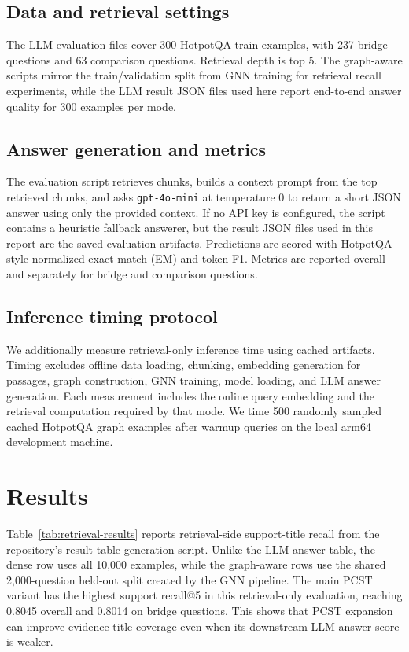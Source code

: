 \documentclass{article}
\begin{document}
\subsection{Data and retrieval settings}

The LLM evaluation files cover 300 HotpotQA train examples, with 237 bridge questions and 63 comparison questions. Retrieval depth is top 5. The graph-aware scripts mirror the train/validation split from GNN training for retrieval recall experiments, while the LLM result JSON files used here report end-to-end answer quality for 300 examples per mode.

\subsection{Answer generation and metrics}

The evaluation script retrieves chunks, builds a context prompt from the top retrieved chunks, and asks \texttt{gpt-4o-mini} at temperature 0 to return a short JSON answer using only the provided context. If no API key is configured, the script contains a heuristic fallback answerer, but the result JSON files used in this report are the saved evaluation artifacts. Predictions are scored with HotpotQA-style normalized exact match (EM) and token F1. Metrics are reported overall and separately for bridge and comparison questions.

\subsection{Inference timing protocol}

We additionally measure retrieval-only inference time using cached artifacts. Timing excludes offline data loading, chunking, embedding generation for passages, graph construction, GNN training, model loading, and LLM answer generation. Each measurement includes the online query embedding and the retrieval computation required by that mode. We time 500 randomly sampled cached HotpotQA graph examples after warmup queries on the local arm64 development machine.

\section{Results}

Table~\ref{tab:retrieval-results} reports retrieval-side support-title recall from the repository's result-table generation script. Unlike the LLM answer table, the dense row uses all 10,000 examples, while the graph-aware rows use the shared 2,000-question held-out split created by the GNN pipeline. The main PCST variant has the highest support recall@5 in this retrieval-only evaluation, reaching 0.8045 overall and 0.8014 on bridge questions. This shows that PCST expansion can improve evidence-title coverage even when its downstream LLM answer score is weaker.
\end{document}
